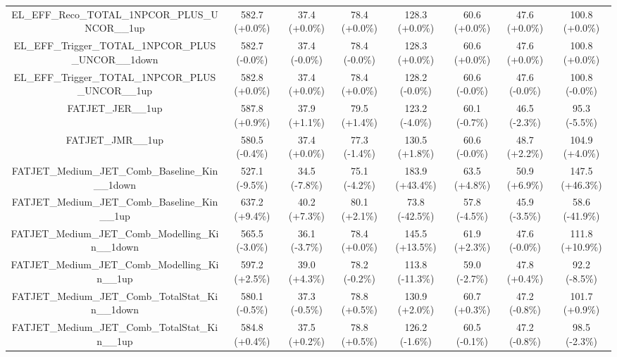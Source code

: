 \begin{table}[htbp!]
\begin{tiny}
\begin{center}
\begin{tabular}{c|c|c|c||c|c|c|c}
EL\_EFF\_Reco\_TOTAL\_1NPCOR\_PLUS\_UNCOR\_\_1up             & 582.7     (+0.0\%) & 37.4      (+0.0\%) & 78.4      (+0.0\%) & 128.3     (+0.0\%) & 60.6      (+0.0\%) & 47.6      (+0.0\%) & 100.8     (+0.0\%) \\ 
EL\_EFF\_Trigger\_TOTAL\_1NPCOR\_PLUS\_UNCOR\_\_1down        & 582.7     (-0.0\%) & 37.4      (-0.0\%) & 78.4      (-0.0\%) & 128.3     (+0.0\%) & 60.6      (+0.0\%) & 47.6      (+0.0\%) & 100.8     (+0.0\%) \\ 
EL\_EFF\_Trigger\_TOTAL\_1NPCOR\_PLUS\_UNCOR\_\_1up          & 582.8     (+0.0\%) & 37.4      (+0.0\%) & 78.4      (+0.0\%) & 128.2     (-0.0\%) & 60.6      (-0.0\%) & 47.6      (-0.0\%) & 100.8     (-0.0\%) \\ 
FATJET\_JER\_\_1up                                           & 587.8     (+0.9\%) & 37.9      (+1.1\%) & 79.5      (+1.4\%) & 123.2     (-4.0\%) & 60.1      (-0.7\%) & 46.5      (-2.3\%) & 95.3      (-5.5\%) \\ 
FATJET\_JMR\_\_1up                                           & 580.5     (-0.4\%) & 37.4      (+0.0\%) & 77.3      (-1.4\%) & 130.5     (+1.8\%) & 60.6      (-0.0\%) & 48.7      (+2.2\%) & 104.9     (+4.0\%) \\ 
FATJET\_Medium\_JET\_Comb\_Baseline\_Kin\_\_1down            & 527.1     (-9.5\%) & 34.5      (-7.8\%) & 75.1      (-4.2\%) & 183.9     (+43.4\%) & 63.5      (+4.8\%) & 50.9      (+6.9\%) & 147.5     (+46.3\%) \\ 
FATJET\_Medium\_JET\_Comb\_Baseline\_Kin\_\_1up              & 637.2     (+9.4\%) & 40.2      (+7.3\%) & 80.1      (+2.1\%) & 73.8      (-42.5\%) & 57.8      (-4.5\%) & 45.9      (-3.5\%) & 58.6      (-41.9\%) \\ 
FATJET\_Medium\_JET\_Comb\_Modelling\_Kin\_\_1down           & 565.5     (-3.0\%) & 36.1      (-3.7\%) & 78.4      (+0.0\%) & 145.5     (+13.5\%) & 61.9      (+2.3\%) & 47.6      (-0.0\%) & 111.8     (+10.9\%) \\ 
FATJET\_Medium\_JET\_Comb\_Modelling\_Kin\_\_1up             & 597.2     (+2.5\%) & 39.0      (+4.3\%) & 78.2      (-0.2\%) & 113.8     (-11.3\%) & 59.0      (-2.7\%) & 47.8      (+0.4\%) & 92.2      (-8.5\%) \\ 
FATJET\_Medium\_JET\_Comb\_TotalStat\_Kin\_\_1down           & 580.1     (-0.5\%) & 37.3      (-0.5\%) & 78.8      (+0.5\%) & 130.9     (+2.0\%) & 60.7      (+0.3\%) & 47.2      (-0.8\%) & 101.7     (+0.9\%) \\ 
FATJET\_Medium\_JET\_Comb\_TotalStat\_Kin\_\_1up             & 584.8     (+0.4\%) & 37.5      (+0.2\%) & 78.8      (+0.5\%) & 126.2     (-1.6\%) & 60.5      (-0.1\%) & 47.2      (-0.8\%) & 98.5      (-2.3\%) \\ 

\end{tabular}
\end{center}
\end{tiny}
\end{table}
